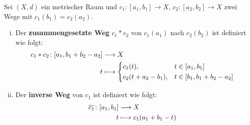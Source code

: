 \begin{definition}
\label{def:2.5}
	Sei $(X,d)$ ein metrischer Raum und $c_1 \colon [a_1,b_1] \rightarrow X$, $c_2 \colon [a_2,b_2] \rightarrow X$ zwei Wege mit $c_1(b_1) = c_2(a_2)$.
	\begin{enumerate}[(i)]
		\item Der \textbf{zusammengesetzte Weg} $c_1 * c_2$ von $c_1(a_1)$ nach $c_2(b_2)$ ist definiert wie folgt: 
		\begin{align*}
			c_1 * c_2\colon [a_1,b_1+b_2-a_2] &\longrightarrow X \\
			t &\longmapsto \begin{dcases}
				c_1(t), & t \in [a_1,b_1] \\
				c_2(t+a_2-b_1), & t \in [b_1,b_1+b_2-a_2]
			\end{dcases}
		\end{align*}
		\item Der \textbf{inverse Weg} von $c_1$ ist definiert wie folgt: 
		\begin{align*}
			\overline{c_1}\colon [a_1,b_1] &\longrightarrow X \\
			t &\longmapsto c_1(a_1+b_1-t)
		\end{align*}
	\end{enumerate}
\end{definition}

